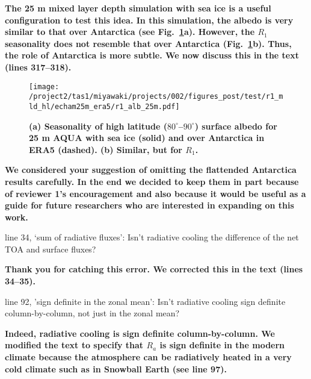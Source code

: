 \documentclass{article}
\begin{document}
\textbf{The 25 m mixed layer depth simulation with sea ice is a useful configuration to test this idea. In this simulation, the albedo is very similar to that over Antarctica (see Fig.~\ref{fig:echam-alb-ice}a). However, the $R_1$ seasonality does not resemble that over Antarctica (Fig.~\ref{fig:echam-alb-ice}b). Thus, the role of Antarctica is more subtle. We now discuss this in the text (lines 317--318).}

\begin{figure}[!h]
    \centering
    \noindent\texttt{[image: /project2/tas1/miyawaki/projects/002/figures\_post/test/r1\_mld\_hl/echam25m\_era5/r1\_alb\_25m.pdf]}
    \caption{\bf (a) Seasonality of high latitude ($80^\circ$--$90^\circ$) surface albedo for 25 m AQUA with sea ice (solid) and over Antarctica in ERA5 (dashed). (b) Similar, but for $R_1$.}
    \label{fig:echam-alb-ice}
\end{figure}

\textbf{We considered your suggestion of omitting the flattended Antarctica results carefully. In the end we decided to keep them in part because of reviewer 1's encouragement and also because it would be useful as a guide for future researchers who are interested in expanding on this work.}


line 34, `sum of radiative fluxes': Isn't radiative cooling the difference of the net TOA and surface fluxes?

\textbf{Thank you for catching this error. We corrected this in the text (lines 34--35).}

line 92, 'sign definite in the zonal mean': Isn't radiative cooling sign definite column-by-column, not just in the zonal mean?

\textbf{Indeed, radiative cooling is sign definite column-by-column. We modified the text to specify that $R_a$ is sign definite in the modern climate because the atmosphere can be radiatively heated in a very cold climate such as in Snowball Earth (see line 97).}
\end{document}
